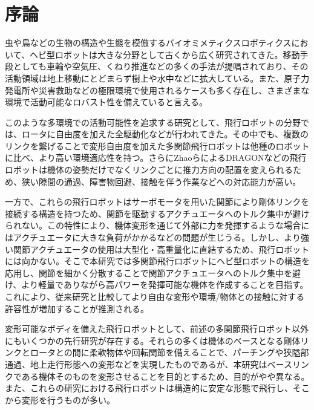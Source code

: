 \documentclass{jarticle}
\begin{document}
\date{} %

\maketitle
\thispagestyle{empty}
\pagestyle{empty}

\small
\section{序論}
虫や鳥などの生物の構造や生態を模倣するバイオミメティクスロボティクスにおいて、ヘビ型ロボットは大きな分野として古くから広く研究されてきた。移動手段としても車輪\cite{wheelsnake}や空気圧\cite{pneumatic}、くねり推進\cite{bodymove}などの多くの手法が提唱されており、その活動領域は地上移動にとどまらず樹上や水中などに拡大している。また、原子力発電所や災害救助などの極限環境で使用されるケースも多く存在し、さまざまな環境で活動可能なロバスト性を備えていると言える。

このような多環境での活動可能性を追求する研究として、飛行ロボットの分野では、ロータに自由度を加えた全駆動化などが行われてきた。その中でも、複数のリンクを繋げることで変形自由度を加えた多関節飛行ロボットは他種のロボットに比べ、より高い環境適応性を持つ。さらにZhaoらによるDRAGON\cite{dragon}などの飛行ロボットは機体の姿勢だけでなくリンクごとに推力方向の配置を変えられるため、狭い隙間の通過、障害物回避、接触を伴う作業などへの対応能力が高い。

一方で、これらの飛行ロボットはサーボモータを用いた関節により剛体リンクを接続する構造を持つため、関節を駆動するアクチュエータへのトルク集中が避けられない。この特性により、機体変形を通じて外部に力を発揮するような場合にはアクチュエータに大きな負荷がかかるなどの問題が生じうる。しかし、より強い関節アクチュエータの使用は大型化・高重量化に直結するため、飛行ロボットには向かない。そこで本研究では多関節飛行ロボットにヘビ型ロボットの構造を応用し、関節を細かく分散することで関節アクチュエータへのトルク集中を避け、より軽量でありながら高パワーを発揮可能な機体を作成することを目指す。これにより、従来研究と比較してより自由な変形や環境/物体との接触に対する許容性が増加することが推測される。

変形可能なボディを備えた飛行ロボットとして、前述の多関節飛行ロボット以外にもいくつかの先行研究が存在する。それらの多くは機体のベースとなる剛体リンクとロータとの間に柔軟物体や回転関節を備えることで、パーチング\cite{perching}\cite{perching2}や狭隘部通過\cite{morph}、地上走行形態への変形\cite{ontheland}などを実現したものであるが、本研究はベースリンクである機体そのものを変形させることを目的とするため、目的がやや異なる。また、これらの研究における飛行ロボットは構造的に安定な形態で飛行し、そこから変形を行うものが多い。
\end{document}
